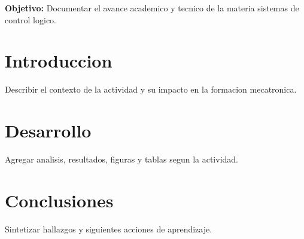\documentclass[spanish,letterpaper,oneside]{article}
\begin{document}
\templatePortrait
\templatePagecfg
\onehalfspacing

\begin{abstractd}
\textbf{Objetivo:} Documentar el avance academico y tecnico de la materia sistemas de control logico.
\end{abstractd}

\templateIndex
\templateFinalcfg

\section{Introduccion}
Describir el contexto de la actividad y su impacto en la formacion mecatronica.

\section{Desarrollo}
Agregar analisis, resultados, figuras y tablas segun la actividad.

\section{Conclusiones}
Sintetizar hallazgos y siguientes acciones de aprendizaje.



\end{document}
